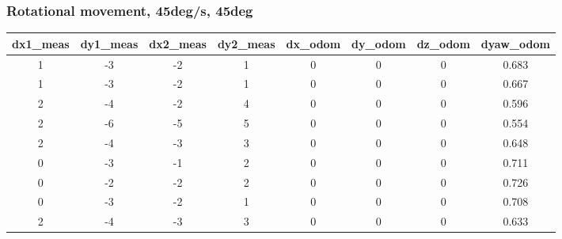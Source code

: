 \documentclass[a4paper, 12pt]{article}
\begin{document}
    \subsubsection{Rotational movement, 45deg/s, 45deg}
    \begin{table}[H]
    \scriptsize
    \begin{tabular}{@{}cccccccc@{}}
    \toprule
    \textbf{dx1\_meas} & \textbf{dy1\_meas} & \textbf{dx2\_meas} & \textbf{dy2\_meas} & \textbf{dx\_odom} & \textbf{dy\_odom} & \textbf{dz\_odom} & \textbf{dyaw\_odom} \\ \midrule
    1                      & -3                     & -2                     & 1                      & 0                 & 0                 & 0                 & 0.683               \\
    1                      & -3                     & -2                     & 1                      & 0                 & 0                 & 0                 & 0.667               \\
    2                      & -4                     & -2                     & 4                      & 0                 & 0                 & 0                 & 0.596               \\
    2                      & -6                     & -5                     & 5                      & 0                 & 0                 & 0                 & 0.554               \\
    2                      & -4                     & -3                     & 3                      & 0                 & 0                 & 0                 & 0.648               \\
    0                      & -3                     & -1                     & 2                      & 0                 & 0                 & 0                 & 0.711               \\
    0                      & -2                     & -2                     & 2                      & 0                 & 0                 & 0                 & 0.726               \\
    0                      & -3                     & -2                     & 1                      & 0                 & 0                 & 0                 & 0.708               \\
    2                      & -4                     & -3                     & 3                      & 0                 & 0                 & 0                 & 0.633               \\

\end{tabular}
\end{table}
\end{document}
